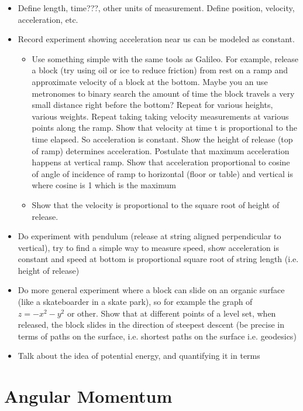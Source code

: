 \documentclass{book}
\begin{document}
	\begin{itemize}
		\item Define length, time???, other units of measurement. Define position, velocity, acceleration, etc.
		\item Record experiment showing acceleration near us can be modeled as constant. 
		\begin{itemize}
			\item Use something simple with the same tools as Galileo. For example, release a block (try using oil or ice to reduce friction) from rest on a ramp and approximate velocity of a block at the bottom. Maybe you an use metronomes to binary search the amount of time the block travels a very small distance right before the bottom? Repeat for various heights, various weights. Repeat taking taking velocity measurements at various points along the ramp. Show that velocity at time t is proportional to the time elapsed. So acceleration is constant. Show the height of release (top of ramp) determines acceleration. Postulate that maximum acceleration happens at vertical ramp. Show that acceleration proportional to cosine of angle of incidence of ramp to horizontal (floor or table) and vertical is where cosine is 1 which is the maximum
			\item Show that the velocity is proportional to the square root of height of release. 
		\end{itemize}
		\item Do experiment with pendulum (release at string aligned perpendicular to vertical), try to find a simple way to measure speed, show acceleration is constant and speed at bottom is proportional square root of string length (i.e. height of release)
		\item Do more general experiment where a block can slide on an organic surface (like a skateboarder in a skate park), so for example the graph of $z = - x^2 - y^2$ or other. Show that at different points of a level set, when released, the block slides in the direction of steepest descent (be precise in terms of paths on the surface, i.e. shortest paths on the surface i.e. geodesics)
		\item Talk about the idea of potential energy, and quantifying it in terms
	\end{itemize}
	
	
	
	\section{Angular Momentum}
	
\end{document}
